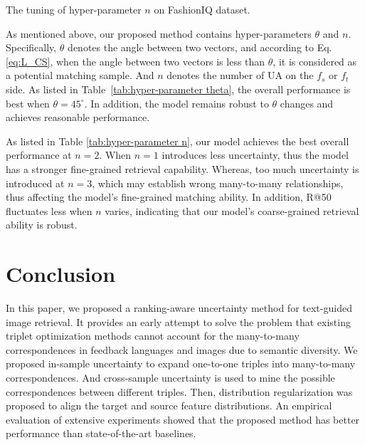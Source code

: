 \documentclass[letterpaper]{article} \usepackage{aaai24}  \usepackage{times}  \usepackage{helvet}  \usepackage{courier}  \usepackage[hyphens]{url}  \usepackage{graphicx} \urlstyle{rm} \def\UrlFont{\rm}  \usepackage{natbib}  \usepackage{caption} \frenchspacing  \setlength{\pdfpagewidth}{8.5in} \setlength{\pdfpageheight}{11in} \usepackage{amsmath,amsfonts}
\begin{document}
\begin{threeparttable}
    \centering
    \caption{The tuning of hyper-parameter $n$ on FashionIQ dataset.}
    \label{tab:hyper-parameter n}
\end{threeparttable}
\fi

As mentioned above, our proposed method contains hyper-parameters $\theta$ and $n$. Specifically, $\theta$ denotes the angle between two vectors, and according to Eq. \ref{eq:L_CS}, when the angle between two vectors is less than $\theta$, it is considered as a potential matching sample. And $n$ denotes the number of UA on the $f_s$ or $f_t$ side. As listed in Table~\ref{tab:hyper-parameter theta}, the overall performance is best when $\theta=45^\circ$. In addition, the model remains robust to $\theta$ changes and achieves reasonable performance.

As listed in Table \ref{tab:hyper-parameter n}, our model achieves the best overall performance at $n=2$. When $n=1$ introduces less uncertainty, thus the model has a stronger fine-grained retrieval capability. Whereas, too much uncertainty is introduced at $n=3$, which may establish wrong many-to-many relationships, thus affecting the model's fine-grained matching ability. In addition, R@50 fluctuates less when $n$ varies, indicating that our model's coarse-grained retrieval ability is robust.

\section{Conclusion}
In this paper, we proposed a ranking-aware uncertainty method for text-guided image retrieval. It provides an early attempt to solve the problem that existing triplet optimization methods cannot account for the many-to-many correspondences in feedback languages and images due to semantic diversity. We proposed in-sample uncertainty to expand one-to-one triples into many-to-many correspondences. And cross-sample uncertainty is used to mine the possible correspondences between different triples. Then, distribution regularization was proposed to align the target and source feature distributions. An empirical evaluation of extensive experiments showed that the proposed method has better performance than state-of-the-art baselines.


\end{document}
